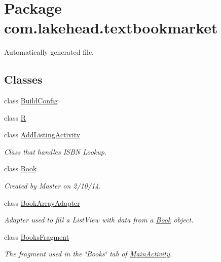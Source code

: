 \hypertarget{namespacecom_1_1lakehead_1_1textbookmarket}{\section{Package com.\-lakehead.\-textbookmarket}
\label{namespacecom_1_1lakehead_1_1textbookmarket}
}


Automatically generated file.  


\subsection*{Classes}
\begin{DoxyCompactItemize}
\item 
class \hyperlink{classcom_1_1lakehead_1_1textbookmarket_1_1_build_config}{Build\-Config}
\item 
class \hyperlink{classcom_1_1lakehead_1_1textbookmarket_1_1_r}{R}
\item 
class \hyperlink{classcom_1_1lakehead_1_1textbookmarket_1_1_add_listing_activity}{Add\-Listing\-Activity}
\begin{DoxyCompactList}\small\item\em Class that handles I\-S\-B\-N Lookup. \end{DoxyCompactList}\item 
class \hyperlink{classcom_1_1lakehead_1_1textbookmarket_1_1_book}{Book}
\begin{DoxyCompactList}\small\item\em Created by Master on 2/10/14. \end{DoxyCompactList}\item 
class \hyperlink{classcom_1_1lakehead_1_1textbookmarket_1_1_book_array_adapter}{Book\-Array\-Adapter}
\begin{DoxyCompactList}\small\item\em Adapter used to fill a List\-View with data from a \hyperlink{classcom_1_1lakehead_1_1textbookmarket_1_1_book}{Book} object. \end{DoxyCompactList}\item 
class \hyperlink{classcom_1_1lakehead_1_1textbookmarket_1_1_books_fragment}{Books\-Fragment}
\begin{DoxyCompactList}\small\item\em The fragment used in the \char`\"{}\-Books\char`\"{} tab of \hyperlink{classcom_1_1lakehead_1_1textbookmarket_1_1_main_activity}{Main\-Activity}. \end{DoxyCompactList}\item 

\end{DoxyCompactItemize}
